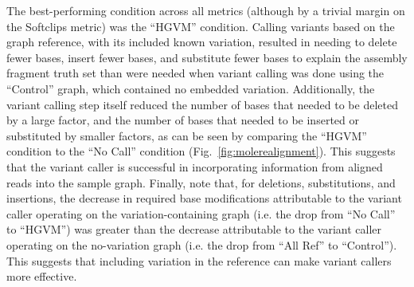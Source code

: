 The best-performing condition across all metrics (although by a trivial margin on the Softclips metric) was the ``HGVM'' condition. Calling variants based on the graph reference, with its included known variation, resulted in needing to delete fewer bases, insert fewer bases, and substitute fewer bases to explain the assembly fragment truth set than were needed when variant calling was done using the ``Control'' graph, which contained no embedded variation. Additionally, the variant calling step itself reduced the number of bases that needed to be deleted by a large factor, and the number of bases that needed to be inserted or substituted by smaller factors, as can be seen by comparing the ``HGVM'' condition to the ``No Call'' condition (Fig.~\ref{fig:molerealignment}). This suggests that the variant caller is successful in incorporating information from aligned reads into the sample graph. Finally, note that, for deletions, substitutions, and insertions, the decrease in required base modifications attributable to the variant caller operating on the variation-containing graph (i.e. the drop from ``No Call'' to ``HGVM'') was greater than the decrease attributable to the variant caller operating on the no-variation graph (i.e. the drop from ``All Ref'' to ``Control''). This suggests that including variation in the reference can make variant callers more effective.

